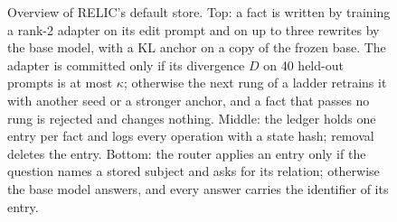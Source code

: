 \begin{figure}[t]
\centering
\resizebox{\textwidth}{!}{}
\caption{Overview of RELIC's default store. Top: a fact is written by training a rank-2 adapter on
its edit prompt and on up to three rewrites by the base model, with a KL anchor on a copy of the frozen
base. The adapter is committed only if its divergence $D$ on 40 held-out prompts is at most $\kappa$;
otherwise the next rung of a ladder retrains it with another seed or a stronger anchor, and a fact
that passes no rung is rejected and changes nothing. Middle: the ledger holds one entry per fact and
logs every operation with a state hash; removal deletes the entry. Bottom: the router applies an
entry only if the question names a stored subject and asks for its relation; otherwise the base model
answers, and every answer carries the identifier of its entry.}
\label{fig:arch}
\end{figure}
